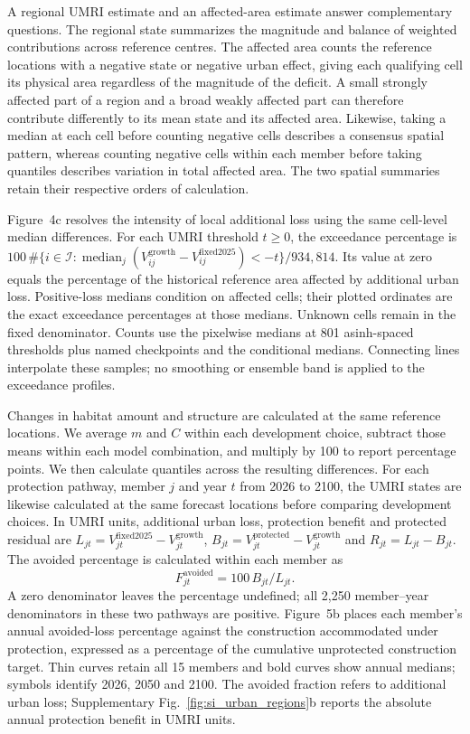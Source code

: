 A regional UMRI estimate and an affected-area estimate answer complementary questions. The regional state summarizes the magnitude and balance of weighted contributions across reference centres. The affected area counts the reference locations with a negative state or negative urban effect, giving each qualifying cell its physical area regardless of the magnitude of the deficit. A small strongly affected part of a region and a broad weakly affected part can therefore contribute differently to its mean state and its affected area. Likewise, taking a median at each cell before counting negative cells describes a consensus spatial pattern, whereas counting negative cells within each member before taking quantiles describes variation in total affected area. The two spatial summaries retain their respective orders of calculation.

Figure~4c resolves the intensity of local additional loss using the same cell-level median differences. For each UMRI threshold $t\geq0$, the exceedance percentage is $100\,\#\{i\in\mathcal I: \operatorname{median}_j(V_{ij}^{\mathrm{growth}}-V_{ij}^{\mathrm{fixed2025}})<-t\}/934{,}814$. Its value at zero equals the percentage of the historical reference area affected by additional urban loss. Positive-loss medians condition on affected cells; their plotted ordinates are the exact exceedance percentages at those medians. Unknown cells remain in the fixed denominator. Counts use the pixelwise medians at 801 asinh-spaced thresholds plus named checkpoints and the conditional medians. Connecting lines interpolate these samples; no smoothing or ensemble band is applied to the exceedance profiles.

Changes in habitat amount and structure are calculated at the same reference locations. We average $m$ and $C$ within each development choice, subtract those means within each model combination, and multiply by 100 to report percentage points. We then calculate quantiles across the resulting differences. For each protection pathway, member $j$ and year $t$ from 2026 to 2100, the UMRI states are likewise calculated at the same forecast locations before comparing development choices. In UMRI units, additional urban loss, protection benefit and protected residual are $L_{jt}=V_{jt}^{\mathrm{fixed2025}}-V_{jt}^{\mathrm{growth}}$, $B_{jt}=V_{jt}^{\mathrm{protected}}-V_{jt}^{\mathrm{growth}}$ and $R_{jt}=L_{jt}-B_{jt}$. The avoided percentage is calculated within each member as
\[
F_{jt}^{\mathrm{avoided}}=100\,B_{jt}/L_{jt}.
\]
A zero denominator leaves the percentage undefined; all 2,250 member--year denominators in these two pathways are positive. Figure~5b places each member's annual avoided-loss percentage against the construction accommodated under protection, expressed as a percentage of the cumulative unprotected construction target. Thin curves retain all 15 members and bold curves show annual medians; symbols identify 2026, 2050 and 2100. The avoided fraction refers to additional urban loss; Supplementary Fig.~\ref{fig:si_urban_regions}b reports the absolute annual protection benefit in UMRI units.


